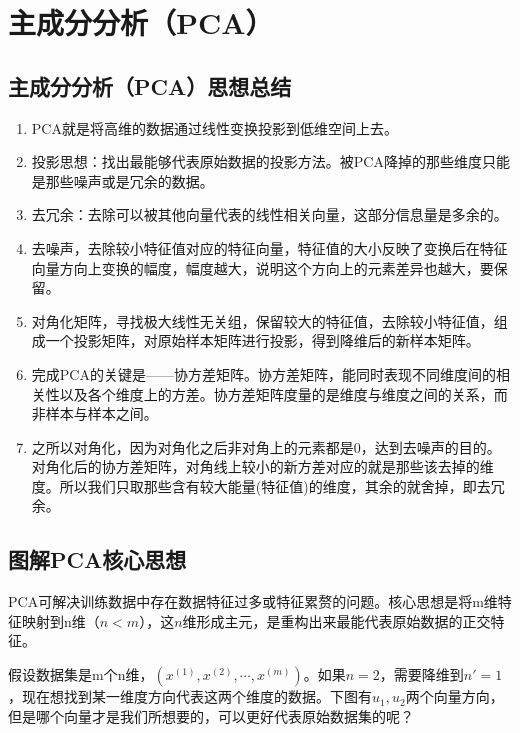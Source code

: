 \section{主成分分析（PCA）}

\subsection{主成分分析（PCA）思想总结}

\begin{enumerate}
	\item PCA就是将高维的数据通过线性变换投影到低维空间上去。
	\item 投影思想：找出最能够代表原始数据的投影方法。被PCA降掉的那些维度只能是那些噪声或是冗余的数据。
	\item 去冗余：去除可以被其他向量代表的线性相关向量，这部分信息量是多余的。
	\item 去噪声，去除较小特征值对应的特征向量，特征值的大小反映了变换后在特征向量方向上变换的幅度，幅度越大，说明这个方向上的元素差异也越大，要保留。
	\item 对角化矩阵，寻找极大线性无关组，保留较大的特征值，去除较小特征值，组成一个投影矩阵，对原始样本矩阵进行投影，得到降维后的新样本矩阵。
	\item 完成PCA的关键是——协方差矩阵。协方差矩阵，能同时表现不同维度间的相关性以及各个维度上的方差。协方差矩阵度量的是维度与维度之间的关系，而非样本与样本之间。
	\item 之所以对角化，因为对角化之后非对角上的元素都是0，达到去噪声的目的。对角化后的协方差矩阵，对角线上较小的新方差对应的就是那些该去掉的维度。所以我们只取那些含有较大能量(特征值)的维度，其余的就舍掉，即去冗余。
\end{enumerate}

\subsection{图解PCA核心思想}
PCA可解决训练数据中存在数据特征过多或特征累赘的问题。核心思想是将m维特征映射到n维（$n<m$），这$n$维形成主元，是重构出来最能代表原始数据的正交特征。

假设数据集是m个n维，$( x^{(1)},  x^{(2)}, \cdots,  x^{(m)})$。如果$n=2$，需要降维到$n'=1$，现在想找到某一维度方向代表这两个维度的数据。下图有$u_1, u_2$两个向量方向，但是哪个向量才是我们所想要的，可以更好代表原始数据集的呢？

